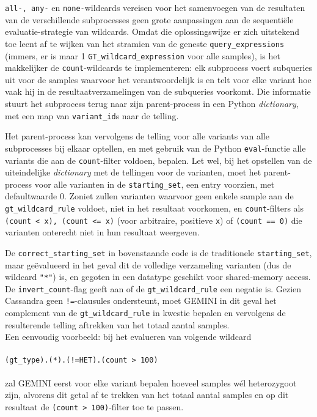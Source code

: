 

\texttt{all-, any-} en \texttt{none-}wildcards vereisen voor het samenvoegen van de resultaten van de verschillende subprocesses geen grote aanpassingen aan de sequenti\"ele evaluatie-strategie van wildcards. Omdat die oplossingswijze er zich uitstekend toe leent af te wijken van het stramien van de geneste \texttt{query\_expressions} (immers, er is maar 1 \texttt{GT\_wildcard\_expression} voor alle samples), is het makkelijker de \texttt{count}-wildcards te implementeren: elk subprocess voert subqueries uit voor de samples waarvoor het verantwoordelijk is en telt voor elke variant hoe vaak hij in de resultaatverzamelingen van de subqueries voorkomt. Die informatie stuurt het subprocess terug naar zijn parent-process in een Python \textit{dictionary}, met een map van \texttt{variant\_id}s naar de telling.



Het parent-process kan vervolgens de telling voor alle variants van alle subprocesses bij elkaar optellen, en met gebruik van de Python \texttt{eval}-functie alle variants die aan de \texttt{count}-filter voldoen, bepalen. Let wel, bij het opstellen van de uiteindelijke \textit{dictionary} met de tellingen voor de varianten, moet het parent-process voor alle varianten in de \texttt{starting\_set}, een entry voorzien, met defaultwaarde 0. Zoniet zullen varianten waarvoor geen enkele sample aan de \texttt{gt\_wildcard\_rule} voldoet, niet in het resultaat voorkomen, en \texttt{count}-filters als \texttt{(count < x), (count <= x)} (voor arbitraire, positieve \texttt{x}) of \texttt{(count == 0)}  die varianten onterecht niet in hun resultaat weergeven.



\noindent De \texttt{correct\_starting\_set} in bovenstaande code is de traditionele \texttt{starting\_set}, maar ge\"evalueerd in het geval dit de volledige verzameling varianten (dus de wildcard \texttt{"*"}) is, en gegoten in een datatype geschikt voor shared-memory access.\\
De \texttt{invert\_count}-flag geeft aan of de \texttt{gt\_wildcard\_rule} een negatie is. Gezien Cassandra geen \texttt{!=}-clausules ondersteunt, moet GEMINI in dit geval het complement van de \texttt{gt\_wildcard\_rule} in kwestie bepalen en vervolgens de resulterende telling aftrekken van het totaal aantal samples. \\ Een eenvoudig voorbeeld: bij het evalueren van volgende wildcard \\\\ 
\texttt{(gt\_type).(*).(!=HET).(count > 100)}\\\\
zal GEMINI eerst voor elke variant bepalen hoeveel samples w\'el heterozygoot zijn, alvorens dit getal af te trekken van het totaal aantal samples en op dit resultaat de \texttt{(count > 100)}-filter toe te passen.


